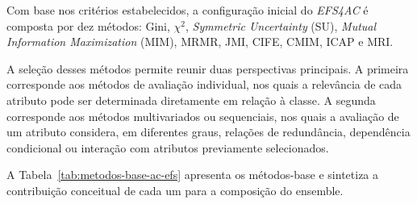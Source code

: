 Com base nos critérios estabelecidos, a configuração inicial do
\textit{EFS4AC} é composta por dez métodos: Gini, $\chi^2$,
\textit{Symmetric Uncertainty} (SU), \textit{Mutual Information Maximization}
(MIM), MRMR, JMI, CIFE, CMIM, ICAP e MRI.

A seleção desses métodos permite reunir duas perspectivas principais. A
primeira corresponde aos métodos de avaliação individual, nos quais a
relevância de cada atributo pode ser determinada diretamente em relação à
classe. A segunda corresponde aos métodos multivariados ou sequenciais, nos
quais a avaliação de um atributo considera, em diferentes graus, relações de
redundância, dependência condicional ou interação com atributos previamente
selecionados.

A Tabela~\ref{tab:metodos-base-ac-efs} apresenta os métodos-base e sintetiza
a contribuição conceitual de cada um para a composição do ensemble.

